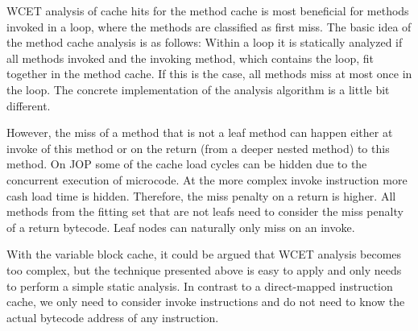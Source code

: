 WCET analysis of cache hits for the method cache is most beneficial
for methods invoked in a loop, where the methods are classified as
first miss. The basic idea of the method cache analysis is as
follows: Within a loop it is statically analyzed if all methods
invoked and the invoking method, which contains the loop, fit
together in the method cache. If this is the case, all methods miss
at most once in the loop. The concrete implementation of the analysis
algorithm is a little bit different.

However, the miss of a method that is not a leaf method can happen
either at invoke of this method or on the return (from a deeper
nested method) to this method. On JOP some of the cache load cycles
can be hidden due to the concurrent execution of microcode. At the
more complex invoke instruction more cash load time is hidden.
Therefore, the miss penalty on a return is higher. All methods from
the fitting set that are not leafs need to consider the miss penalty
of a return bytecode. Leaf nodes can naturally only miss on an
invoke.

With the variable block cache, it could be argued that WCET analysis
becomes too complex, but the technique presented above is easy to
apply and only needs to perform a simple static analysis. In contrast
to a direct-mapped instruction cache, we only need to consider invoke
instructions and do not need to know the actual bytecode address of
any instruction.


%
%
%
%

